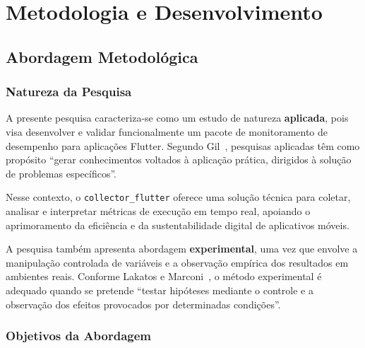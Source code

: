 
\chapter{Metodologia e Desenvolvimento}


\section{Abordagem Metodológica}

\subsection{Natureza da Pesquisa}

A presente pesquisa caracteriza-se como um estudo de natureza \textbf{aplicada}, pois visa desenvolver e validar funcionalmente um pacote de monitoramento de desempenho para aplicações Flutter.
Segundo Gil~\cite{gil2017}, pesquisas aplicadas têm como propósito “gerar conhecimentos voltados à aplicação prática, dirigidos à solução de problemas específicos”.

Nesse contexto, o \texttt{collector\_flutter} oferece uma solução técnica para coletar, analisar e interpretar métricas de execução em tempo real, apoiando o aprimoramento da eficiência e da sustentabilidade digital de aplicativos móveis.

A pesquisa também apresenta abordagem \textbf{experimental}, uma vez que envolve a manipulação controlada de variáveis e a observação empírica dos resultados em ambientes reais. Conforme Lakatos e Marconi~\cite{lakatos2021}, o método experimental é adequado quando se pretende “testar hipóteses mediante o controle e a observação dos efeitos provocados por determinadas condições”.

\subsection{Objetivos da Abordagem}

